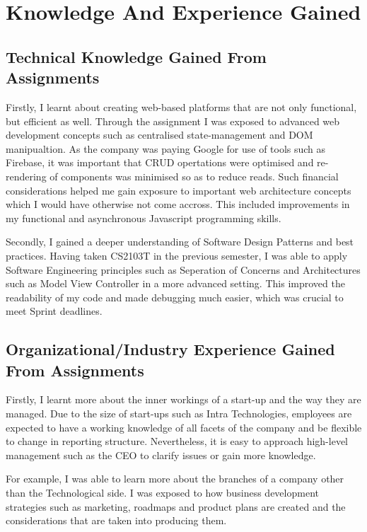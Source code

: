 \section{Knowledge And Experience Gained}
\subsection{Technical Knowledge Gained From Assignments}
\noindent
Firstly, I learnt about creating web-based platforms that are not only functional, but efficient as well. Through the assignment I was exposed to advanced web development concepts such as centralised state-management and DOM manipualtion. As the company was paying Google for use of tools such as Firebase, it was important that
CRUD opertations were optimised and re-rendering of components was minimised so as to reduce reads. Such financial considerations helped me gain exposure to important web architecture concepts which I would have otherwise
not come accross. This included improvements in my functional and asynchronous Javascript programming skills.

\noindent
Secondly, I gained a deeper understanding of Software Design Patterns and best practices. Having taken CS2103T in the previous semester, I was able to apply Software Engineering principles such as Seperation of Concerns and
Architectures such as Model View Controller in a more advanced setting. This improved the readability of my code and made debugging much easier, which was crucial to meet Sprint deadlines.

\subsection{Organizational/Industry Experience Gained From Assignments}
\noindent 
Firstly, I learnt more about the inner workings of a start-up and the way they are managed. Due to the size of start-ups such as Intra Technologies, employees are expected to have a working knowledge of all facets of the
company and be flexible to change in reporting structure. Nevertheless, it is easy
to approach high-level management such as the CEO to clarify issues or gain more knowledge. 

\noindent
For example, I was able to learn more about the branches of a company other than the Technological side. I was exposed to how
business development strategies such as marketing, roadmaps and product plans are created and the considerations that are taken into producing them.

